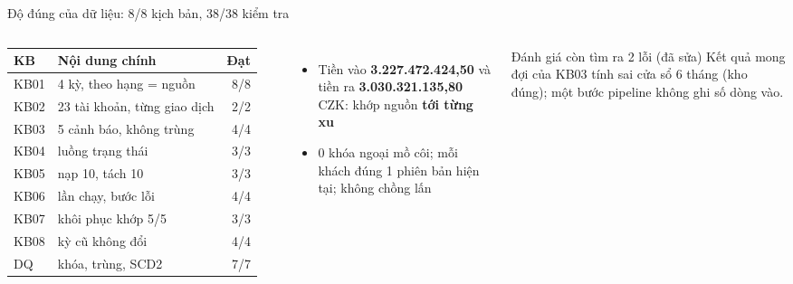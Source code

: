 \documentclass[aspectratio=169,11pt]{beamer}
\begin{document}
\begin{frame}{Độ đúng của dữ liệu: 8/8 kịch bản, 38/38 kiểm tra}
  \begin{columns}[T]
    \footnotesize
    \begin{tabular}{l l r}
      \toprule
      \textbf{KB} & \textbf{Nội dung chính} & \textbf{Đạt} \\
      \midrule
      KB01 & 4 kỳ, theo hạng = nguồn & 8/8 \\
      KB02 & 23 tài khoản, từng giao dịch & 2/2 \\
      KB03 & 5 cảnh báo, không trùng & 4/4 \\
      KB04 & luồng trạng thái & 3/3 \\
      KB05 & nạp 10, tách 10 & 3/3 \\
      KB06 & lần chạy, bước lỗi & 4/4 \\
      KB07 & khôi phục khớp 5/5 & 3/3 \\
      KB08 & kỳ cũ không đổi & 4/4 \\
      DQ & khóa, trùng, SCD2 & 7/7 \\
      \bottomrule
    \end{tabular}
    \small
    \begin{itemize}
      \item Tiền vào \textbf{3.227.472.424,50} và tiền ra \textbf{3.030.321.135,80} CZK: khớp nguồn \textbf{tới từng xu}
      \item 0 khóa ngoại mồ côi; mỗi khách đúng 1 phiên bản hiện tại; không chồng lấn
    \end{itemize}
    \begin{block}{Đánh giá còn tìm ra 2 lỗi (đã sửa)}
      \footnotesize Kết quả mong đợi của KB03 tính sai cửa sổ 6 tháng (kho đúng); một bước pipeline không ghi số dòng vào.
    \end{block}
  \end{columns}
\end{frame}
\end{document}
